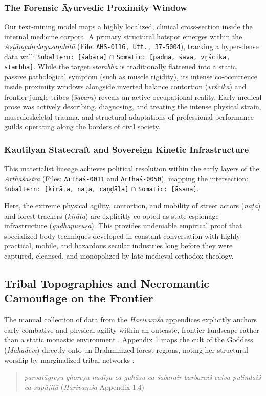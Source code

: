 \documentclass[11pt,twoside,letterpaper]{article}
\begin{document}
\subsubsection{The Forensic Āyurvedic Proximity Window}
Our text-mining model maps a highly localized, clinical cross-section inside the internal medicine corpora. A primary structural hotspot emerges within the \textit{Aṣṭāṇgahṛdayasaṃhitā} (File: \texttt{AHS-0116, Utt., 37-5004}), tracking a hyper-dense data wall: \texttt{Subaltern: [śabara]} $\cap$ \texttt{Somatic: [padma, śava, vṛścika, stambha]}. While the target \textit{stambha} 
is traditionally flattened into a static, passive pathological symptom (such as muscle rigidity), its intense co-occurrence inside proximity windows alongside inverted balance contortion (\textit{vṛścika}) and frontier jungle tribes (\textit{s̄abara}) reveals an active occupational reality. Early medical prose was actively describing, diagnosing, and treating the intense physical strain, musculoskeletal trauma, and structural adaptations of professional performance guilds operating along the borders of civil society.

\subsubsection{Kautilyan Statecraft and Sovereign Kinetic Infrastructure}
This materialist lineage achieves political resolution within the early layers of the \textit{Arthaśāstra} (Files: \texttt{Arthaś-0011} and \texttt{Arthaś-0050}), mapping the intersection: \texttt{Subaltern: [kirāta, naṭa, caṇḍāla]} $\cap$ \texttt{Somatic: [āsana]}. 

Here, the extreme physical agility, contortion, and mobility of street actors (\textit{naṭa}) and forest trackers (\textit{kirāta}) are explicitly co-opted as state espionage infrastructure (\textit{gūḍhapuruṣa}). This provides undeniable empirical proof that specialized body techniques developed in constant conversation with highly practical, mobile, and hazardous secular industries long before they were captured, cleansed, and monopolized by late-medieval orthodox theology.

\subsection{Tribal Topographies and Necromantic Camouflage on the Frontier}
The manual collection of data from the \textit{Harivaṃśa} appendices explicitly anchors early combative and physical agility within an outcaste, frontier landscape rather than a static monastic environment \citep{mccartney2026}. Appendix 1 maps the cult of the Goddess (\textit{Mahādevī}) directly onto un-Brahminized forest regions, noting her structural worship by marginalized tribal networks \citep{HV_App}:
\begin{quote}
\textit{parvatāgreṣu ghoreṣu nadīṣu ca guhāsu ca
śabarair barbaraiś caiva pulindaiś ca supūjitā} (\textit{Harivaṃśa} Appendix 1.4)
\end{quote}
\end{document}
